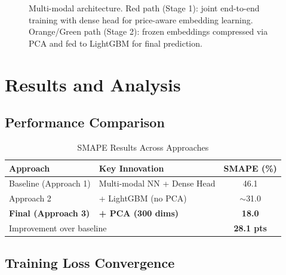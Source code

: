 \documentclass[conference]{IEEEtran}
\begin{document}
\begin{figure}[H]
\caption{Multi-modal architecture. Red path (Stage 1): joint end-to-end training with dense head for price-aware embedding learning. Orange/Green path (Stage 2): frozen embeddings compressed via PCA and fed to LightGBM for final prediction.}
\label{fig:arch}
\end{figure}

\section{Results and Analysis}

\subsection{Performance Comparison}

\begin{table}[H]
\centering
\caption{SMAPE Results Across Approaches}
\begin{tabular}{llc}
\toprule
Approach & Key Innovation & SMAPE (\%) \\
\midrule
Baseline (Approach 1) & Multi-modal NN + Dense Head & 46.1 \\
Approach 2 & + LightGBM (no PCA) & $\sim$31.0 \\
\textbf{Final (Approach 3)} & \textbf{+ PCA (300 dims)} & \textbf{18.0} \\
\midrule
\multicolumn{2}{l}{Improvement over baseline} & \textbf{28.1 pts} \\
\bottomrule
\end{tabular}
\end{table}

\subsection{Training Loss Convergence}
\end{document}
